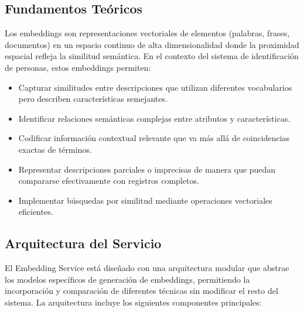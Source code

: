 \documentclass[12pt,a4paper]{article}
\begin{document}
\subsection{Fundamentos Teóricos}
\label{subsec:es-fundamentos}

Los embeddings son representaciones vectoriales de elementos (palabras, frases, documentos) en un espacio continuo de alta dimensionalidad donde la proximidad espacial refleja la similitud semántica. En el contexto del sistema de identificación de personas, estos embeddings permiten:

\begin{itemize}
    \item Capturar similitudes entre descripciones que utilizan diferentes vocabularios pero describen características semejantes.
    
    \item Identificar relaciones semánticas complejas entre atributos y características.
    
    \item Codificar información contextual relevante que va más allá de coincidencias exactas de términos.
    
    \item Representar descripciones parciales o imprecisas de manera que puedan compararse efectivamente con registros completos.
    
    \item Implementar búsquedas por similitud mediante operaciones vectoriales eficientes.
\end{itemize}

\subsection{Arquitectura del Servicio}
\label{subsec:es-arquitectura}

El Embedding Service está diseñado con una arquitectura modular que abstrae los modelos específicos de generación de embeddings, permitiendo la incorporación y comparación de diferentes técnicas sin modificar el resto del sistema. La arquitectura incluye los siguientes componentes principales:
\end{document}
